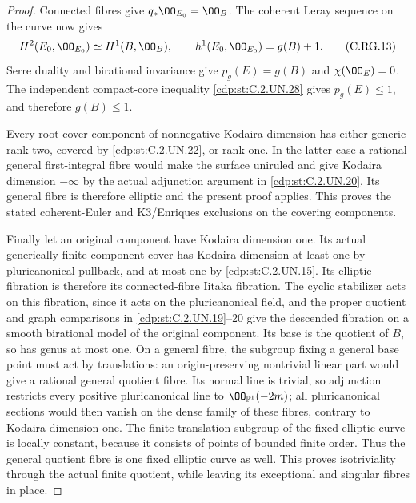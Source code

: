 \begin{proof}
Connected fibres give $q_*\OO_{E_0}=\OO_B$.
The coherent Leray sequence on the curve now gives
\[
 H^2(E_0,\OO_{E_0})\simeq H^1(B,\OO_B),\qquad
 h^1(E_0,\OO_{E_0})=g(B)+1.
                                                               \tag{C.RG.13}\label{cdp:eq:C.RG.13}
\]
Serre duality and birational invariance give
$p_g(E)=g(B)$ and $\chi(\OO_E)=0$.
The independent compact-core inequality
\ref{cdp:st:C.2.UN.28} gives $p_g(E)\le1$, and therefore
$g(B)\le1$.

Every root-cover component of nonnegative Kodaira
dimension has either generic rank two, covered by
\ref{cdp:st:C.2.UN.22}, or rank one. In the latter case a rational
general first-integral fibre would make the surface
uniruled and give Kodaira dimension $-\infty$ by
the actual adjunction argument in \ref{cdp:st:C.2.UN.20}.
Its general fibre is therefore elliptic and the
present proof applies. This proves the stated
coherent-Euler and K3/Enriques exclusions on the
covering components.

Finally let an original component have Kodaira
dimension one. Its actual generically finite
component cover has Kodaira dimension at least
one by pluricanonical pullback, and at most one
by \ref{cdp:st:C.2.UN.15}. Its elliptic fibration is therefore
its connected-fibre Iitaka fibration. The cyclic
stabilizer acts on this fibration, since it acts
on the pluricanonical field, and the proper
quotient and graph comparisons in \ref{cdp:st:C.2.UN.19}--20
give the descended fibration on a smooth
birational model of the original component.
Its base is the quotient of $B$, so has genus
at most one. On a general fibre, the subgroup
fixing a general base point must act by
translations: an origin-preserving nontrivial
linear part would give a rational general quotient
fibre. Its normal line is trivial, so adjunction
restricts every positive pluricanonical line to
$\OO_{\mathbb P^1}(-2m)$; all pluricanonical sections
would then vanish on the dense family of these
fibres, contrary to Kodaira dimension one. The finite translation
subgroup of the fixed elliptic curve is locally
constant, because it consists of points of
bounded finite order. Thus the general quotient
fibre is one fixed elliptic curve as well.
This proves isotriviality through the actual
finite quotient, while leaving its exceptional
and singular fibres in place.
\end{proof}


